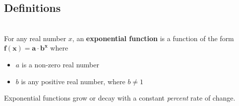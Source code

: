 \subsection*{Definitions} \label{def-exponential-intro}

\begin{myDefinition}~\\[0.5mm]
For any real number $x$, an {\bf exponential function} is a function of the form $\boldsymbol{f(x) = a\cdot b^x}$ where
	\begin{itemize}
	\setlength{\itemsep}{0in}
		\item $a$ is a non-zero real number
		\item $b$ is any positive real number, where $b\neq 1$
	\end{itemize}
Exponential functions grow or decay with a constant {\it percent} rate of change.  
\end{myDefinition}


